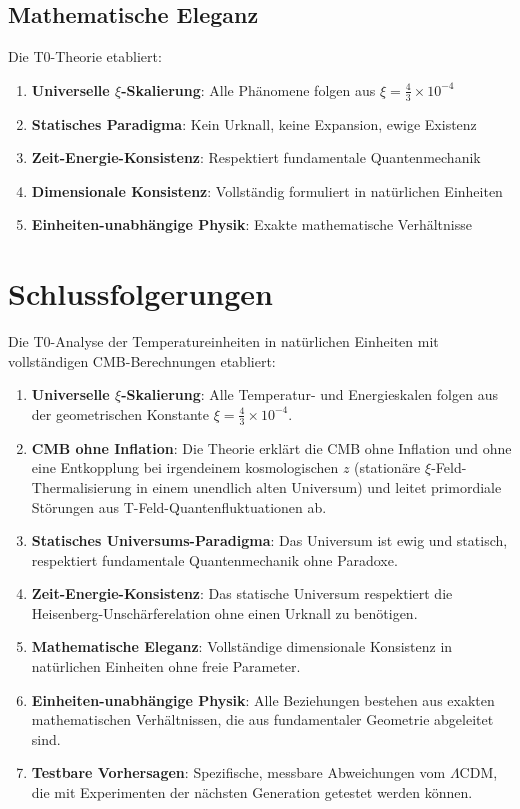 	\subsection{Mathematische Eleganz}
	
	Die T0-Theorie etabliert:
	\begin{enumerate}
		\item \textbf{Universelle $\xi$-Skalierung}: Alle Phänomene folgen aus $\xi = \frac{4}{3} \times 10^{-4}$
		\item \textbf{Statisches Paradigma}: Kein Urknall, keine Expansion, ewige Existenz
		\item \textbf{Zeit-Energie-Konsistenz}: Respektiert fundamentale Quantenmechanik
		\item \textbf{Dimensionale Konsistenz}: Vollständig formuliert in natürlichen Einheiten
		\item \textbf{Einheiten-unabhängige Physik}: Exakte mathematische Verhältnisse
	\end{enumerate}
	
	\section{Schlussfolgerungen}
	
	Die T0-Analyse der Temperatureinheiten in natürlichen Einheiten mit vollständigen CMB-Berechnungen etabliert:
	
	\begin{enumerate}
		\item \textbf{Universelle $\xi$-Skalierung}: Alle Temperatur- und Energieskalen folgen aus der geometrischen Konstante $\xi = \frac{4}{3} \times 10^{-4}$.
		
		\item \textbf{CMB ohne Inflation}: Die Theorie erklärt die CMB ohne Inflation und ohne eine Entkopplung bei irgendeinem kosmologischen $z$ (stationäre $\xi$-Feld-Thermalisierung in einem unendlich alten Universum) und leitet primordiale Störungen aus T-Feld-Quantenfluktuationen ab.
		
		\item \textbf{Statisches Universums-Paradigma}: Das Universum ist ewig und statisch, respektiert fundamentale Quantenmechanik ohne Paradoxe.
		
		\item \textbf{Zeit-Energie-Konsistenz}: Das statische Universum respektiert die Heisenberg-Unschärferelation ohne einen Urknall zu benötigen.
		
		\item \textbf{Mathematische Eleganz}: Vollständige dimensionale Konsistenz in natürlichen Einheiten ohne freie Parameter.
		
		\item \textbf{Einheiten-unabhängige Physik}: Alle Beziehungen bestehen aus exakten mathematischen Verhältnissen, die aus fundamentaler Geometrie abgeleitet sind.
		
		\item \textbf{Testbare Vorhersagen}: Spezifische, messbare Abweichungen vom $\Lambda$CDM, die mit Experimenten der nächsten Generation getestet werden können.
	\end{enumerate}
	
